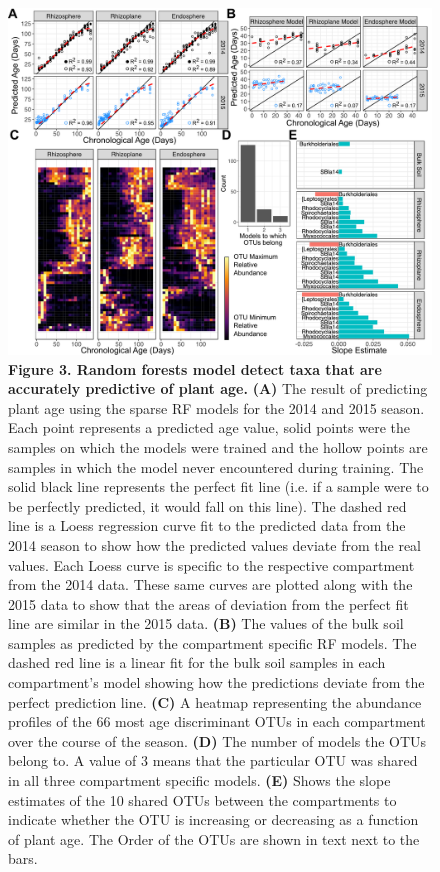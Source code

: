 \begin{figure}[h]
\centering
\includegraphics[width=6in]{Figures/figure3_3}
\caption[Figure 4.3]{\textbf{Figure 3. Random forests model detect taxa that are accurately predictive of plant age.} \textbf{(A)} The result of predicting plant age using the sparse RF models for the 2014 and 2015 season. Each point represents a predicted age value, solid points were the samples on which the models were trained and the hollow points are samples in which the model never encountered during training. The solid black line represents the perfect fit line (i.e. if a sample were to be perfectly predicted, it would fall on this line). The dashed red line is a Loess regression curve fit to the predicted data from the 2014 season to show how the predicted values deviate from the real values. Each Loess curve is specific to the respective compartment from the 2014 data. These same curves are plotted along with the 2015 data to show that the areas of deviation from the perfect fit line are similar in the 2015 data. \textbf{(B)} The values of the bulk soil samples as predicted by the compartment specific RF models. The dashed red line is a linear fit for the bulk soil samples in each compartment's model showing how the predictions deviate from the perfect prediction line. \textbf{(C)} A heatmap representing the abundance profiles of the 66 most age discriminant OTUs in each compartment over the course of the season. \textbf{(D)} The number of models the OTUs belong to. A value of 3 means that the particular OTU was shared in all three compartment specific models. \textbf{(E)} Shows the slope estimates of the 10 shared OTUs between the compartments to indicate whether the OTU is increasing or decreasing as a function of plant age. The Order of the OTUs are shown in text next to the bars.}
\label{Figure 4.3}
\end{figure}

